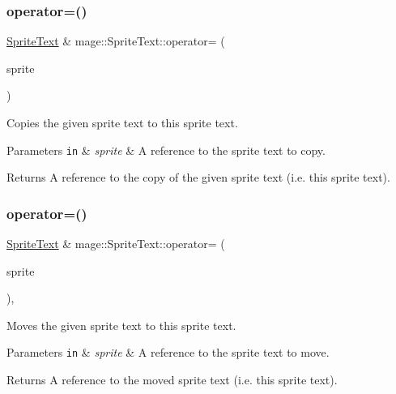 \subsubsection{\texorpdfstring{operator=()}{operator=()}\hspace{0.1cm}{\footnotesize\ttfamily [1/2]}}
{\footnotesize\ttfamily \hyperlink{classmage_1_1_sprite_text}{Sprite\+Text} \& mage\+::\+Sprite\+Text\+::operator= (\begin{DoxyParamCaption}\item[{const \hyperlink{classmage_1_1_sprite_text}{Sprite\+Text} \&}]{sprite }\end{DoxyParamCaption})\hspace{0.3cm}{\ttfamily [default]}}

Copies the given sprite text to this sprite text.


\begin{DoxyParams}[1]{Parameters}
\mbox{\tt in}  & {\em sprite} & A reference to the sprite text to copy. \\
\hline
\end{DoxyParams}
\begin{DoxyReturn}{Returns}
A reference to the copy of the given sprite text (i.\+e. this sprite text). 
\end{DoxyReturn}
\hypertarget{classmage_1_1_sprite_text_a203a5e33e16d412691d43928809e5a50}{}\label{classmage_1_1_sprite_text_a203a5e33e16d412691d43928809e5a50} 
\subsubsection{\texorpdfstring{operator=()}{operator=()}\hspace{0.1cm}{\footnotesize\ttfamily [2/2]}}
{\footnotesize\ttfamily \hyperlink{classmage_1_1_sprite_text}{Sprite\+Text} \& mage\+::\+Sprite\+Text\+::operator= (\begin{DoxyParamCaption}\item[{\hyperlink{classmage_1_1_sprite_text}{Sprite\+Text} \&\&}]{sprite }\end{DoxyParamCaption})\hspace{0.3cm}{\ttfamily [default]}, {\ttfamily [noexcept]}}

Moves the given sprite text to this sprite text.


\begin{DoxyParams}[1]{Parameters}
\mbox{\tt in}  & {\em sprite} & A reference to the sprite text to move. \\
\hline
\end{DoxyParams}
\begin{DoxyReturn}{Returns}
A reference to the moved sprite text (i.\+e. this sprite text). 
\end{DoxyReturn}
\hypertarget{classmage_1_1_sprite_text_a46235c90d3fc9872c2342cd17eaa9e89}{}\label{classmage_1_1_sprite_text_a46235c90d3fc9872c2342cd17eaa9e89} 
